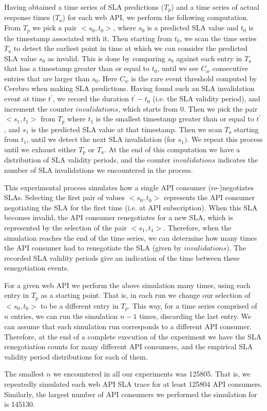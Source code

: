 Having obtained a time series of SLA predictions ($T_{p}$) and a time series of actual response 
times ($T_{a}$) for each web API, we perform the following computation. From $T_{p}$ we pick a
pair $<s_{0},t_{0}>$, where $s_{0}$ is a predicted SLA value and $t_{0}$ is the timestamp associated with it. 
Then starting from $t_{0}$, we scan the time series $T_{a}$ to detect the earliest point in time
at which we can consider the predicted SLA value $s_{0}$ as invalid. This is done by comparing $s_{0}$
against each entry in $T_{a}$ that has a timestamp greater than or equal to $t_{0}$, until we see $C_{w}$ 
consecutive entries that are larger than $s_{0}$. Here $C_{w}$ is the rare event threshold 
computed by Cerebro when making SLA predictions. Having found such an SLA invalidation
event at time $t^{\prime}$, we record the duration $t^{\prime} - t_{0}$ (i.e. the SLA validity period), and 
increment the counter $invalidations$, 
which starts from $0$. Then we pick the pair $<s_{1},t_{1}>$ from $T_{p}$ where $t_{1}$ is the smallest
timestamp greater than or equal to $t^{\prime}$, and $s_{1}$ is the predicted SLA value at that timestamp.
Then we scan $T_{a}$ starting from $t_{1}$, until we detect the next SLA invalidation (for $s_{1})$. 
We repeat this process
until we exhaust either $T_{p}$ or $T_{a}$. At the end of this computation we have a distribution of SLA
validity periods, and the counter $invalidations$ indicates the number of SLA invalidations we encountered
in the process.

This experimental process simulates how a single API consumer (re-)negotiates SLAs.
Selecting the first pair of values $<s_{0},t_{0}>$ represents
the API consumer negotiating the SLA for the first time (i.e. at API subscription). 
When this SLA becomes invalid, the API consumer
renegotiates for a new SLA, which is represented by the selection of the pair $<s_{1},t_{1}>$. 
Therefore, when the simulation reaches the end of the time series, we can determine how many times the
API consumer had to renegotiate the SLA (given by $invalidations$). The
recorded SLA validity periods give an indication of the time between these renegotiation events.

For a given web API we perform the above simulation many times, using each entry in $T_{p}$ as
a starting point. That is, in each run we change our selection of $<s_{0},t_{0}>$ to be a different
entry in $T_{p}$. This way, for a time series comprised of $n$ entries, we can run the simulation 
$n-1$ times, discarding the last entry. We can assume that each simulation run corresponds to a different API
consumer. Therefore, at the end of a complete execution of the experiment we have the SLA
renegotiation counts for many different API consumers, and the empirical SLA validity period distributions 
for each of them. 

The smallest $n$ we encountered in all our experiments was 125805. That is, we
repeatedly simulated each web API SLA trace 
for at least 125804 API consumers. Similarly, the largest number of API consumers 
we performed the simulation for is 145130.
